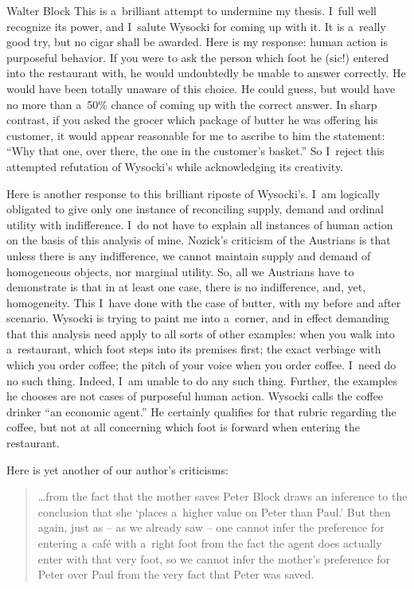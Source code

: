 \begin{artengenv}{Walter Block}
This is a~brilliant attempt to undermine my thesis. I~full well recognize its power, and I~salute Wysocki for coming up with it. It is a~really good try, but no cigar shall be awarded. Here is my response: human action is purposeful behavior. If you were to ask the person which foot he (sic!) entered into the restaurant with, he would undoubtedly be unable to answer correctly. He would have been totally unaware of this choice. He could guess, but would have no more than a~50\% chance of coming up with the correct answer. In sharp contrast, if you asked the grocer which package of butter he was offering his customer, it would appear reasonable for me to ascribe to him the statement: ``Why that one, over there, the one in the customer's basket.'' So I~reject this attempted refutation of Wysocki's while acknowledging its creativity.



Here is another response to this brilliant riposte of Wysocki's. I~am logically obligated to give only one instance of reconciling supply, demand and ordinal utility with indifference. I~do not have to explain all instances of human action on the basis of this analysis of mine. Nozick's criticism of the Austrians is that unless there is any indifference, we cannot maintain supply and demand of homogeneous objects, nor marginal utility. So, all we Austrians have to demonstrate is that in at least one case, there is no indifference, and, yet, homogeneity. This I~have done with the case of butter, with my before and after scenario. Wysocki is trying to paint me into a~corner, and in effect demanding that this analysis need apply to all sorts of other examples: when you walk into a~restaurant, which foot steps into its premises first; the exact verbiage with which you order coffee; the pitch of your voice when you order coffee. I~need do no such thing. Indeed, I~am unable to do any such thing. Further, the examples he chooses are not cases of purposeful human action. Wysocki calls the coffee drinker ``an economic agent.'' He certainly qualifies for that rubric regarding the coffee, but not at all concerning which foot is forward when entering the restaurant.



Here is yet another of our author's criticisms:



\begin{quote}
…from the fact that the mother saves Peter Block draws an inference to the conclusion that she ‘places a~higher value on Peter than Paul.' But then again, just as -- as we already saw -- one cannot infer the preference for entering a~café with a~right foot from the fact the agent does actually enter with that very foot, so we cannot infer the mother's preference for Peter over Paul from the very fact that Peter was saved.
\end{quote}




\end{artengenv}
